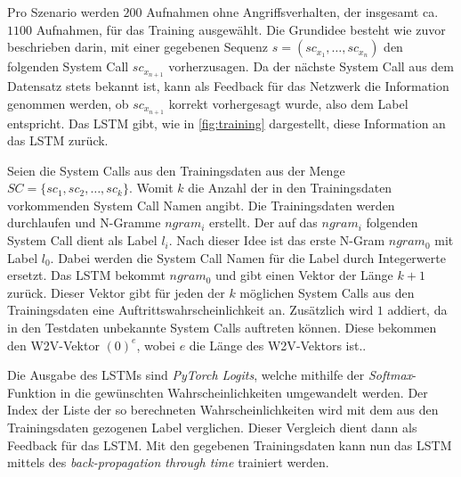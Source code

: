             Pro Szenario werden $200$ Aufnahmen ohne Angriffsverhalten, der insgesamt ca.\ $1100$ Aufnahmen, für das Training ausgewählt.
            Die Grund\-idee besteht wie zuvor beschrieben darin, mit einer gegebenen Sequenz $s = (sc_{x_1},\dots,sc_{x_n})$ den folgenden System Call $sc_{x_{n+1}}$ vorherzusagen. 
            Da der nächste System Call aus dem Datensatz stets bekannt ist, kann als Feedback für das Netzwerk die Information genommen werden, ob $sc_{x_{n+1}}$ korrekt vorhergesagt wurde, also dem Label entspricht.
            Das \ac{LSTM} gibt, wie in \autoref{fig:training} dargestellt, diese Information an das \ac{LSTM} zurück.\par\medskip

            Seien die System Calls aus den Trainingsdaten aus der Menge $SC = \{sc_1,sc_2,\dots,sc_k\}$.
            Womit $k$ die Anzahl der in den Trainingsdaten vorkommenden System Call Namen angibt.
            Die Trainingsdaten werden durchlaufen und N-Gramme $ngram_i$ erstellt.
            Der auf das $ngram_i$ folgenden System Call dient als Label $l_i$.
            Nach dieser Idee ist das erste N-Gram $ngram_0$ mit Label $l_0$.
            Dabei werden die System Call Namen für die Label durch Integerwerte ersetzt. 
            Das \ac{LSTM} bekommt $ngram_0$ und gibt einen Vektor der Länge $k+1$ zurück.
            Dieser Vektor gibt für jeden der $k$ möglichen System Calls aus den Trainingsdaten eine Auftrittswahrscheinlichkeit an.
            Zusätzlich wird $1$ addiert, da in den Testdaten unbekannte System Calls auftreten können.
            Diese bekommen den \ac{W2V}-Vektor $(0)^e$, wobei $e$ die Länge des \ac{W2V}-Vektors ist..\par\medskip

            Die Ausgabe des \acp{LSTM} sind \textit{PyTorch Logits}, welche mithilfe der \textit{Softmax}-Funktion in die gewünschten Wahrscheinlichkeiten umgewandelt werden.
            Der Index der Liste der so berechneten Wahrscheinlichkeiten wird mit dem aus den Trainingsdaten gezogenen Label verglichen.
            Dieser Vergleich dient dann als Feedback für das \ac{LSTM}.
            Mit den gegebenen Trainingsdaten kann nun das \ac{LSTM} mittels des \textit{back-propagation through time}  trainiert werden.

